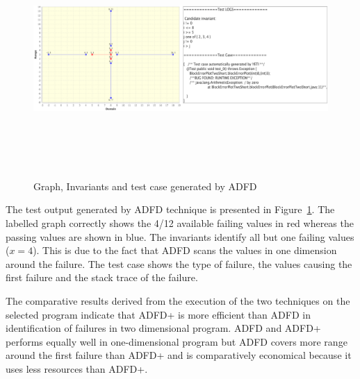 \begin{figure}[H]
\centering
\includegraphics[width= 15.5cm,height=9cm]{chapter7/adfdCombined.png}
\caption{Graph, Invariants and test case generated by ADFD}
\label{fig:ADFD}
\end{figure}

The test output generated by ADFD technique is presented in Figure~\ref{fig:ADFD}. The labelled graph correctly shows the 4/12 available failing values in red whereas the passing values are shown in blue. The invariants identify all but one failing values ($x = 4$). This is due to the fact that ADFD scans the values in one dimension around the failure. The test case shows the type of failure, the values causing the first failure and the stack trace of the failure. 

The comparative results derived from the execution of the two techniques on the selected program indicate that ADFD+ is more efficient than ADFD in identification of failures in two dimensional program. ADFD and ADFD+ performs equally well in one-dimensional program but ADFD covers more range around the first failure than ADFD+ and is comparatively economical because it uses less resources than ADFD+.


